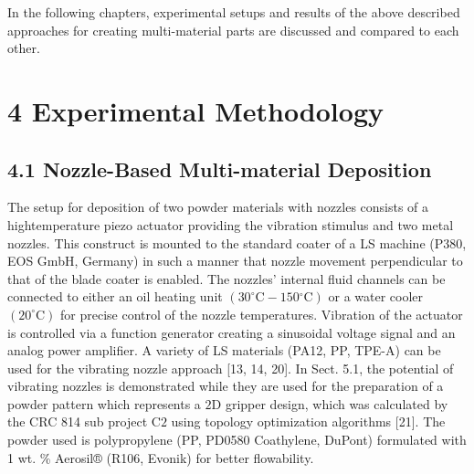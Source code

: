 \documentclass[10pt]{article}
\begin{document}
In the following chapters, experimental setups and results of the above described approaches for creating multi-material parts are discussed and compared to each other.

\section*{4 Experimental Methodology}
\subsection*{4.1 Nozzle-Based Multi-material Deposition}
The setup for deposition of two powder materials with nozzles consists of a hightemperature piezo actuator providing the vibration stimulus and two metal nozzles. This construct is mounted to the standard coater of a LS machine (P380, EOS GmbH, Germany) in such a manner that nozzle movement perpendicular to that of the blade coater is enabled. The nozzles' internal fluid channels can be connected to either an oil heating unit $\left(30^{\circ} \mathrm{C}-150{ }^{\circ} \mathrm{C}\right)$ or a water cooler $\left(20^{\circ} \mathrm{C}\right)$ for precise control of the nozzle temperatures. Vibration of the actuator is controlled via a function generator creating a sinusoidal voltage signal and an analog power amplifier. A variety of LS materials (PA12, PP, TPE-A) can be used for the vibrating nozzle approach [13, 14, 20]. In Sect. 5.1, the potential of vibrating nozzles is demonstrated while they are used for the preparation of a powder pattern which represents a $2 \mathrm{D}$ gripper design, which was calculated by the CRC 814 sub project $\mathrm{C} 2$ using topology optimization algorithms [21]. The powder used is polypropylene (PP, PD0580 Coathylene, DuPont) formulated with 1 wt. \% Aerosil® (R106, Evonik) for better flowability.
\end{document}
